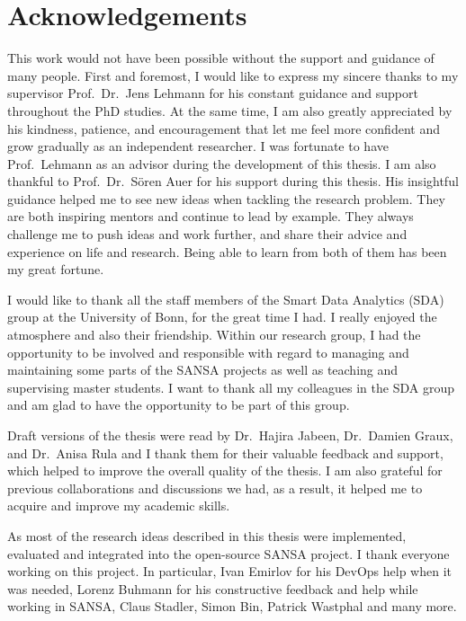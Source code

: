 \chapter*{Acknowledgements}
\label{sec:ack}
This work would not have been possible without the support and guidance of many people.
First and foremost, I would like to express my sincere thanks to my supervisor Prof.\ Dr.\ Jens Lehmann for his constant guidance and support throughout the PhD studies.
At the same time, I am also greatly appreciated by his kindness, patience, and encouragement that let me feel more confident and grow gradually as an independent researcher.
I was fortunate to have Prof.\ Lehmann as an advisor during the development of this thesis.
I am also thankful to Prof.\ Dr.\ S{\"o}ren Auer for his support during this thesis.
His insightful guidance helped me to see new ideas when tackling the research problem.
They are both inspiring mentors and continue to lead by example. 
They always challenge me to push ideas and work further, and share their advice and experience on life and research. 
Being able to learn from both of them has been my great fortune.

I would like to thank all the staff members of the Smart Data Analytics (SDA) group at the University of Bonn, for the great time I had.
I really enjoyed the atmosphere and also their friendship.
Within our research group, I had the opportunity to be involved and responsible with regard to managing and maintaining some parts of the SANSA projects as well as teaching and supervising master students.
I want to thank all my colleagues in the SDA group and am glad to have the opportunity to be part of this group.

Draft versions of the thesis were read by Dr.\ Hajira Jabeen, Dr.\ Damien Graux, and Dr.\ Anisa Rula and I thank them for their valuable feedback and support, which helped to improve the overall quality of the thesis.
I am also grateful for previous collaborations and discussions we had, as a result, it helped me to acquire and improve my academic skills.

As most of the research ideas described in this thesis were implemented, evaluated and integrated into the open-source SANSA project.
I thank everyone working on this project.
In particular, Ivan Emirlov for his DevOps help when it was needed, Lorenz Buhmann for his constructive feedback and help while working in SANSA, Claus Stadler, Simon Bin, Patrick Wastphal and many more.


